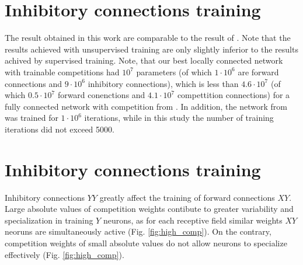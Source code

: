 \documentclass[a4paper]{article}
\begin{document}
\pagebreak

\section{Inhibitory connections training}
\label{section:competition-training}
The result obtained in this work are comparable to the result of \cite{saunders2019locally}. Note that the results achieved with unsupervised training are only slightly inferior to the results achived by supervised training. Note, that our best locally connected network with trainable competitions had $ 10^7 $ parameters (of which $ 1 \cdot 10^6 $ are forward connections and $ 9 \cdot 10^6 $ inhibitory connections), which is less than $ 4.6 \cdot 10^7 $ (of which $ 0.5 \cdot 10^7 $ forward conenctions and $ 4.1 \cdot 10^7 $ compettition connections) for a fully connected network with competition from \cite{mnist2}. In addition, the network from \cite{mnist2} was trained for $ 1 \cdot 10^6 $ iterations, while in this study the number of training iterations did not exceed 5000. 

\section {Inhibitory connections training}
Inhibitory connections $YY$ greatly affect the training of forward connections $XY$. Large absolute values of competition weights contibute to greater variability and specialization in training $Y$ neurons, as for each receptive field similar weights $XY$ neoruns are simultaneously active (Fig. \ref{fig:high_comp}). On the contrary, competition weights of small absolute values do not allow neurons to specialize effectively (Fig. \ref{fig:high_comp}). 
\end{document}
